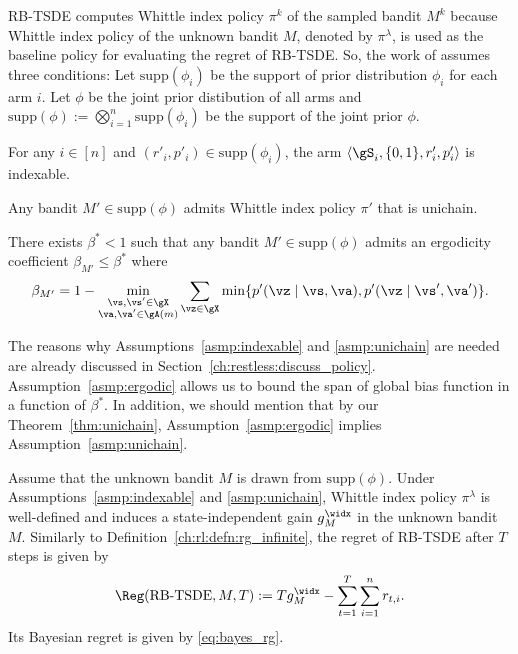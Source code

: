 RB-TSDE \cite{akbarzadeh2022learning} computes Whittle index policy $\pi^k$ of the sampled bandit $M^k$ because Whittle index policy of the unknown bandit $M$, denoted by $\pi^\lambda$, is used as the baseline policy for evaluating the regret of RB-TSDE.
So, the work of \cite{akbarzadeh2022learning} assumes three conditions: Let $\mathrm{supp}(\phi_i)$ be the support of prior distribution $\phi_i$ for each arm $i$.
Let $\phi$ be the joint prior distibution of all arms and $\mathrm{supp}(\phi):=\bigotimes_{i=1}^n\mathrm{supp}(\phi_i)$ be the support of the joint prior $\phi$.
\begin{asmp}
    \label{asmp:indexable}
    For any $i\in[n]$ and $(r'_i,p'_i)\in\mathrm{supp}(\phi_i)$, the arm $\langle\gS_i,\{0,1\},r'_i,p'_i\rangle$ is indexable.
\end{asmp}
\begin{asmp}
    \label{asmp:unichain}
    Any bandit $M'\in\mathrm{supp}(\phi)$ admits Whittle index policy $\pi'$ that is unichain.
\end{asmp}
\begin{asmp}
    \label{asmp:ergodic}
    There exists $\beta^*<1$ such that any bandit $M'\in\mathrm{supp}(\phi)$ admits an ergodicity coefficient $\beta_{M'}\le \beta^*$ where
    \begin{align}
        \label{eq:ergodic_M}
        \beta_{M'} = 1-\min_{\substack{\vs,\vs'\in\gX \\\va,\va'\in\gA(m)}} \sum_{\vz\in\gX} \min\{p'(\vz \mid \vs, \va), p'(\vz \mid \vs', \va')\}.
    \end{align}
\end{asmp}
The reasons why Assumptions~\ref{asmp:indexable} and \ref{asmp:unichain} are needed are already discussed in Section~\ref{ch:restless:discuss_policy}.
Assumption~\ref{asmp:ergodic} allows us to bound the span of global bias function in a function of $\beta^*$.
In addition, we should mention that by our Theorem~\ref{thm:unichain}, Assumption~\ref{asmp:ergodic} implies Assumption~\ref{asmp:unichain}.

Assume that the unknown bandit $M$ is drawn from $\mathrm{supp}(\phi)$.
Under Assumptions~\ref{asmp:indexable} and \ref{asmp:unichain}, Whittle index policy $\pi^\lambda$ is well-defined and induces a state-independent gain $g^\widx_M$ in the unknown bandit $M$.
Similarly to Definition~\ref{ch:rl:defn:rg_infinite}, the regret of RB-TSDE after $T$ steps is given by
\begin{align}
    \Reg(\textnormal{RB-TSDE},M,T) := Tg^\widx_M - \sum_{t=1}^{T} \sum_{i=1}^nr_{t,i}. \label{ch:restless:eq:regret}
\end{align}
Its Bayesian regret is given by \eqref{eq:bayes_rg}.

